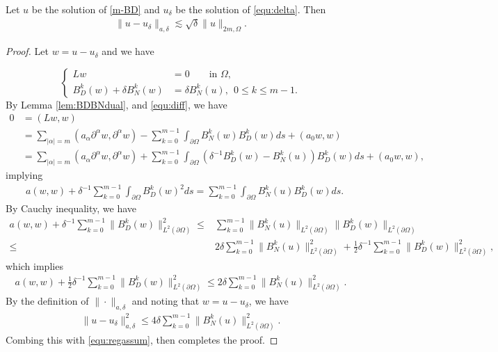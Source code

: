 \begin{lemma}\label{Nitchtrick}
  Let $u$ be the solution of \eqref{m-BD} and $u_\delta$ be the solution of \eqref{equ:delta}. Then 
  \begin{align}\label{diff:uudelta}
\|u-u_\delta\|_{a,\delta} \lesssim\sqrt{\delta}  \|u\|_{2m,\Omega}.
\end{align}
\end{lemma}
\begin{proof}
Let $w=u-u_{\delta}$ and we have 

\begin{equation} \label{equ:diff}
\left\{
\begin{aligned}
Lw &= 0 \qquad \mbox{in }\Omega, \\
B_D^k(w)+\delta B_N^k(w)  &= \delta B_N^k(u),\ \ 0\le k\le m-1.
\end{aligned}
\right.
\end{equation}
By Lemma \ref{lem:BDBNdual}, and \eqref{equ:diff},  we have 
\begin{align}
0&=(Lw, w)
\\
&=\sum_{|\alpha|=m}(a_\alpha\partial^\alpha w, \partial^\alpha w)-\sum_{k=0}^{m-1}\int_{\partial \Omega}B_N^k(w)B_D^k(w) ds+(a_0w, w)
\\
&=\sum_{|\alpha|=m}(a_\alpha\partial^\alpha w, \partial^\alpha w)+ \sum_{k=0}^{m-1} \int_{\partial \Omega}(\delta^{-1}B_D^k(w)-  B_N^k(u) )B_D^k(w) ds+(a_0w, w),
\end{align}
implying
\begin{align}
&a(w, w)+ \delta^{-1}\sum_{k=0}^{m-1}\int_{\partial \Omega}B_D^k(w)^2 ds
=
\sum_{k=0}^{m-1}\int_{\partial \Omega}B_N^k(u)B_D^k(w) ds.
\end{align}
By Cauchy inequality, we have 
\begin{align}
a(w,w)+\delta^{-1}\sum_{k=0}^{m-1}\|B_D^k(w)\|^2_{L^2(\partial \Omega)}
\le& \sum_{k=0}^{m-1}\|B_N^k(u) \|_{L^2(\partial \Omega)}\|B_D^k(w)\|_{L^2(\partial \Omega)}
\\
\le& 2\delta  \sum_{k=0}^{m-1}\|B_N^k(u) \|^2_{L^2(\partial \Omega)}+\frac12 \delta^{-1} \sum_{k=0}^{m-1} \|B_D^k(w)\|^2_{L^2(\partial \Omega)},
\end{align}
which implies
\begin{align}
a(w,w)+\frac12 \delta^{-1}\sum_{k=0}^{m-1}\|B_D^k(w)\|^2_{L^2(\partial \Omega)}\le 2\delta  \sum_{k=0}^{m-1}\|B_N^k(u) \|^2_{L^2(\partial \Omega)}.
\end{align}
By the definition of $\|\cdot\|_{a,\delta}$ and noting that $w=u-u_\delta$, we have 
\begin{align}\label{diff:uudelta1}
\|u-u_\delta\|_{a,\delta}^2\le 4\delta  \sum_{k=0}^{m-1}\|B_N^k(u) \|^2_{L^2(\partial \Omega)}.
\end{align}
Combing this with \eqref{equ:regassum}, then completes the proof.
\end{proof}

